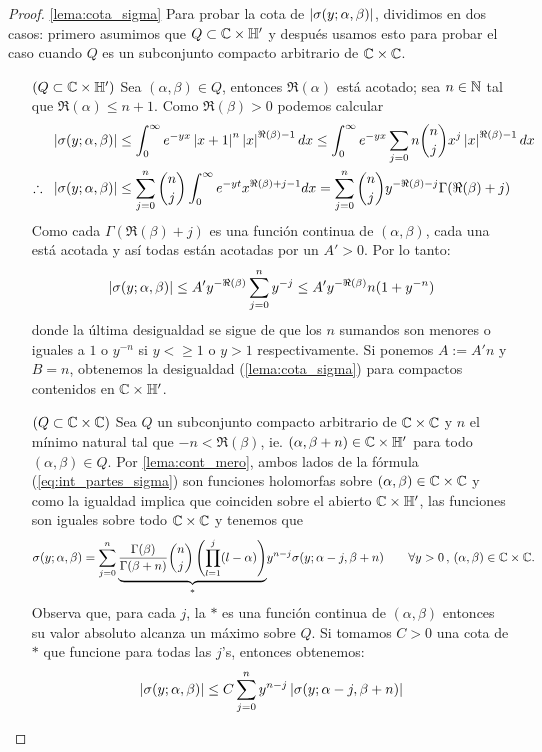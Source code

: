 \documentclass[../../tesis_maestria]{subfiles}
\begin{document}
\begin{proof}\ref{lema:cota_sigma}
Para probar la cota de $\left| \sigma(y;\alpha,\beta) \right|$, dividimos en dos casos: primero asumimos que
$Q\subset\mathbb{C}\times\mathbb{H}'$ y despu\'es usamos esto para probar el caso cuando
$Q$ es un subconjunto compacto arbitrario de $\mathbb{C}\times\mathbb{C}$.
\begin{itemize}
\item[$(Q\subset\mathbb{C}\times\mathbb{H}')$] Sea $(\alpha,\beta)\in Q$, entonces $\Re(\alpha)$ est\'a acotado;
  sea $n\in\mathbb{N}$ tal que $\Re(\alpha)\leq n+1$. Como $\Re(\beta)>0$ podemos calcular
  \begin{align*}
    \left| \sigma(y;\alpha,\beta) \right|
    &\leq\int_0^{\infty}e^{-yx}\left| x+1 \right|^n\left| x \right|^{\Re(\beta)-1}dx\leq
      \int_0^{\infty}e^{-yx}\sum_{j=0}n\binom{n}{j}x^j\left| x \right|^{\Re(\beta)-1}dx\\
    \therefore\;\;\left| \sigma(y;\alpha,\beta) \right|
    &\leq \sum_{j=0}^n\binom{n}{j}\int_0^{\infty}e^{-yt}x^{\Re(\beta)+j-1}dx=
      \sum_{j=0}^n\binom{n}{j}y^{-\Re(\beta)-j}\Gamma(\Re(\beta)+j)
  \end{align*}
  Como cada $\Gamma(\Re(\beta)+j)$ es una funci\'on continua de $(\alpha,\beta)$, cada
  una est\'a acotada y as\'i todas est\'an acotadas por un $A'>0$. Por lo tanto:
  \[
    \left| \sigma(y;\alpha,\beta) \right|\leq A'y^{-\Re(\beta)}\sum_{j=0}^ny^{-j}\leq A'y^{-\Re(\beta)}n(1+y^{-n})
  \]
  donde la \'ultima desigualdad se sigue de que los $n$ sumandos son menores o iguales a
  $1$ o $y^{-n}$ si $y<\geq1$ o $y>1$ respectivamente. Si ponemos $A:=A'n$ y $B=n$, obtenemos
  la desigualdad (\ref{lema:cota_sigma}) para compactos contenidos en $\mathbb{C}\times\mathbb{H}'$.
  
\item[$(Q\subset\mathbb{C}\times\mathbb{C})$] Sea $Q$ un subconjunto compacto arbitrario de $\mathbb{C}\times\mathbb{C}$
  y $n$ el m\'inimo natural tal que $-n<\Re(\beta)$, ie. $(\alpha,\beta+n)\in\mathbb{C}\times\mathbb{H}'$
  para todo $(\alpha,\beta)\in Q$.  Por \ref{lema:cont_mero}, ambos lados de la f\'ormula
  (\ref{eq:int_partes_sigma}) son funciones holomorfas sobre $(\alpha,\beta)\in\mathbb{C}\times\mathbb{C}$
  y como la igualdad implica que coinciden sobre el abierto $\mathbb{C}\times\mathbb{H}'$, las funciones
  son iguales sobre todo $\mathbb{C}\times\mathbb{C}$ y tenemos que
  \[
    \sigma(y;\alpha,\beta)=\sum_{j=0}^n\underset{*}{\underbrace{\frac{\Gamma(\beta)}{\Gamma(\beta+n)}
    \binom{n}{j}\left( \prod_{l=1}^j(l-\alpha) \right)}}y^{n-j}\sigma(y;\alpha-j,\beta+n)
    \qquad\forall y>0\, ,\, (\alpha,\beta)\in\mathbb{C}\times\mathbb{C}.
  \]
  Observa que, para cada $j$, la $*$ es una funci\'on continua de $(\alpha,\beta)$ entonces su
  valor absoluto alcanza un m\'aximo sobre $Q$. Si tomamos $C>0$ una cota de $*$ que funcione
  para todas las $j$'s, entonces obtenemos:
  \begin{equation}\label{deq:paso_inter}
    \left| \sigma(y;\alpha,\beta) \right|\leq C\sum_{j=0}^ny^{n-j}\left| \sigma(y;\alpha-j,\beta+n) \right|
  \end{equation}
  

\end{itemize}
\end{proof}
\end{document}
